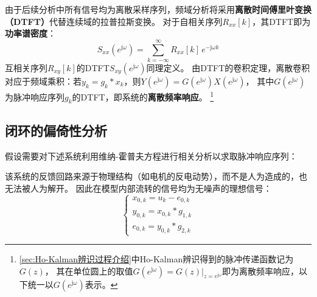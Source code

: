 由于后续分析中所有信号均为离散采样序列，频域分析将采用\textbf{离散时间傅里叶变换（DTFT）}代替连续域的拉普拉斯变换。
对于自相关序列\(R_{xx}[k]\)，其DTFT即为\textbf{功率谱密度}：
\begin{equation*}
    S_{xx}(e^{\mathrm{j}\omega})=\sum_{k=-\infty}^{\infty}R_{xx}[k]\,e^{-\mathrm{j}\omega k}
\end{equation*}
互相关序列\(R_{xy}[k]\)的DTFT\(S_{xy}(e^{\mathrm{j}\omega})\)同理定义。
由DTFT的卷积定理，离散卷积对应于频域乘积：若\(y_k = g_k * x_k\)，则\(Y(e^{\mathrm{j}\omega})=G(e^{\mathrm{j}\omega})X(e^{\mathrm{j}\omega})\)，
其中\(G(e^{\mathrm{j}\omega})\)为脉冲响应序列\(g_k\)的DTFT，即系统的\textbf{离散频率响应}。
\footnote{\ref{sec:Ho-Kalman辨识过程介绍}中Ho-Kalman辨识得到的脉冲传递函数记为\(G(z)\)，
其在单位圆上的取值\(G(e^{\mathrm{j}\omega})=G(z)|_{z=e^{\mathrm{j}\omega}}\)即为离散频率响应，以下统一以\(G(e^{\mathrm{j}\omega})\)表示。}

\subsection{闭环的偏倚性分析}
假设需要对下述系统利用维纳-霍普夫方程进行相关分析以求取脉冲响应序列：
\begin{center}
\end{center}

该系统的反馈回路来源于物理结构（如电机的反电动势），而不是人为造成的，也无法被人为解开。
因此在模型内部流转的信号均为无噪声的理想信号：
\begin{equation*}
    \begin{cases}
    x_{0,k}=u_k-e_{0,k}\\
    y_{0,k}=x_{0,k}*g_{1,k}\\
    e_{0,k}=y_{0,k}*g_{2,k}
    \end{cases}
\end{equation*}

